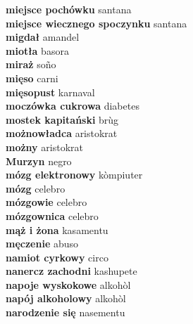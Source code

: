\textbf{ miejsce pochówku  } santana \\
\textbf{ miejsce wiecznego spoczynku  } santana \\
\textbf{ migdał  } amandel \\
\textbf{ miotła  } basora \\
\textbf{ miraż  } soño \\
\textbf{ mięso  } carni \\
\textbf{ mięsopust  } karnaval \\
\textbf{ moczówka cukrowa  } diabetes \\
\textbf{ mostek kapitański  } brùg \\
\textbf{ możnowładca  } aristokrat \\
\textbf{ możny  } aristokrat \\
\textbf{ Murzyn  } negro \\
\textbf{ mózg elektronowy  } kòmpiuter \\
\textbf{ mózg  } celebro \\
\textbf{ mózgowie  } celebro \\
\textbf{ mózgownica  } celebro \\
\textbf{ mąż i żona  } kasamentu \\
\textbf{ męczenie  } abuso \\
\textbf{ namiot cyrkowy  } circo \\
\textbf{ nanercz zachodni  } kashupete \\
\textbf{ napoje wyskokowe  } alkohòl \\
\textbf{ napój alkoholowy  } alkohòl \\
\textbf{ narodzenie się  } nasementu \\
